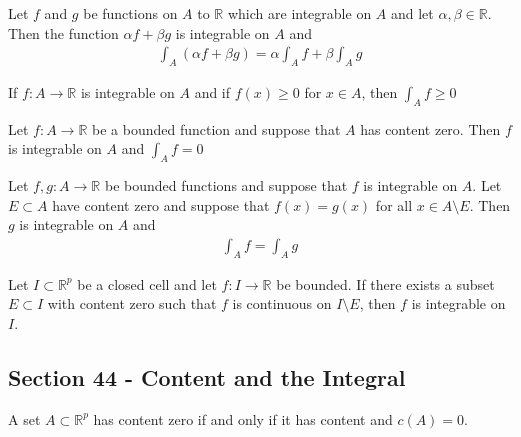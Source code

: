 \documentclass[12pt]{article}
\newcommand{\R}{\mathbb{R}}
\newenvironment{theorem}[2][Theorem]{\begin{trivlist}
\item[\hskip \labelsep {\bfseries #1}\hskip \labelsep {\bfseries #2.}]}{\end{trivlist}}
\newenvironment{lemma}[2][Lemma]{\begin{trivlist}
\item[\hskip \labelsep {\bfseries #1}\hskip \labelsep {\bfseries #2.}]}{\end{trivlist}}
\begin{document}
\begin{theorem}{43.5}
Let $f$ and $g$ be functions on $A$ to $\R$ which are integrable on $A$ and let $\alpha, \beta \in \R$. Then the function $\alpha f + \beta g$ is integrable on $A$ and
\begin{align*}
\int_A (\alpha f + \beta g) = \alpha \int_A f + \beta \int_A g
\end{align*}
\end{theorem}

\begin{theorem}{43.6}
If $f: A \to \R$ is integrable on $A$ and if $f(x) \geq 0$ for $x \in A$, then $\int_A f \geq 0$
\end{theorem}

\begin{theorem}{43.7}
Let $f: A \to \R$ be a bounded function and suppose that $A$ has content zero. Then $f$ is integrable on $A$ and $\int_A f = 0$
\end{theorem}

\begin{theorem}{43.8}
Let $f, g: A \to \R$ be bounded functions and suppose that $f$ is integrable on $A$. Let $E \subset A$ have content zero and suppose that $f(x) = g(x)$ for all $x \in A \setminus E$. Then $g$ is integrable on $A$ and
\begin{align*}
\int_A f = \int_A g
\end{align*}
\end{theorem}

\begin{theorem}[Integrability]{Theorem}
Let $I \subset \R^p$ be a closed cell and let $f: I \to \R$ be bounded. If there exists a subset $E \subset I$ with content zero such that $f$ is continuous on $I \setminus E$, then $f$ is integrable on $I$.
\end{theorem}

\subsection*{Section 44 - Content and the Integral}

\begin{lemma}{44.3}
A set $A \subset \R^p$ has content zero if and only if it has content and $c(A) = 0$.
\end{lemma}
\end{document}
